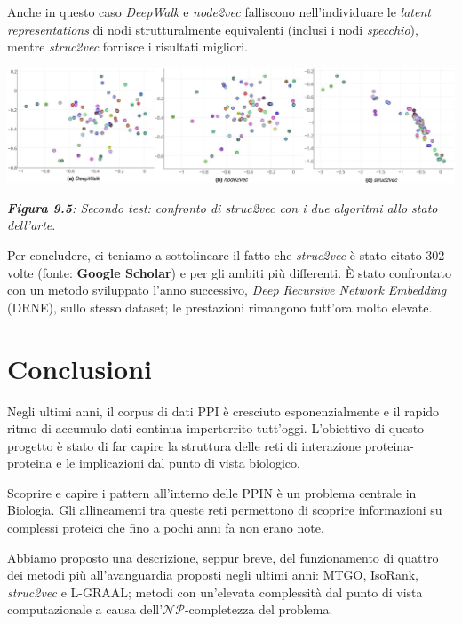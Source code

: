 \documentclass[11pt]{article}
\begin{document}
Anche in questo caso \textit{DeepWalk} e \textit{node2vec} falliscono nell'individuare le \textit{latent representations} di nodi strutturalmente equivalenti (inclusi i nodi \textit{specchio}), mentre \textit{struc2vec} fornisce i risultati migliori.

\begin{center}
\includegraphics[scale=0.35]{a4}

\begin{small}\textit{\textbf{Figura 9.5}: Secondo test: confronto di struc2vec con i due algoritmi allo stato dell'arte}.\end{small}
\end{center}

Per concludere, ci teniamo a sottolineare il fatto che \textit{struc2vec} è stato citato 302 volte (fonte: \textbf{Google Scholar}) e per gli ambiti più differenti. \`E stato confrontato con un metodo sviluppato l'anno successivo, \textit{Deep Recursive Network Embedding} (DRNE), sullo stesso dataset; le prestazioni rimangono tutt'ora molto elevate.

\pagebreak
\section{Conclusioni}
Negli ultimi anni, il corpus di dati PPI è cresciuto esponenzialmente e il rapido ritmo di accumulo dati continua imperterrito tutt'oggi. L'obiettivo di questo progetto è stato di far capire la struttura delle reti di interazione proteina-proteina e le implicazioni dal punto di vista biologico.

Scoprire e capire i pattern all'interno delle PPIN è un problema centrale in Biologia. Gli allineamenti tra queste reti permettono di scoprire informazioni su complessi proteici che fino a pochi anni fa non erano note. 

Abbiamo proposto una descrizione, seppur breve, del funzionamento di quattro dei metodi più all'avanguardia proposti negli ultimi anni: MTGO, IsoRank, \textit{struc2vec} e L-GRAAL; metodi con un'elevata complessità dal punto di vista computazionale a causa dell'$\mathcal{NP}$-completezza del problema.\\
\end{document}

